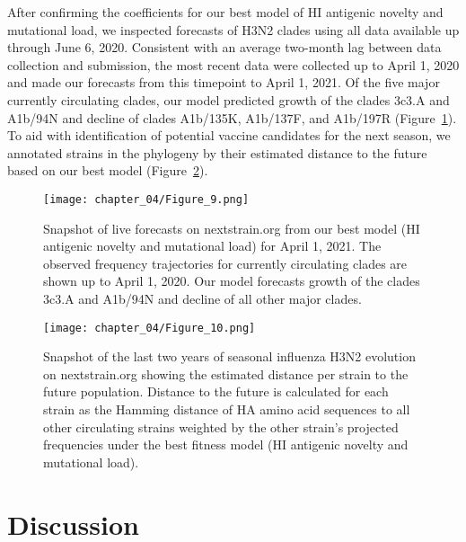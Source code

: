 After confirming the coefficients for our best model of HI antigenic novelty and mutational load, we inspected forecasts of H3N2 clades using all data available up through June 6, 2020.
Consistent with an average two-month lag between data collection and submission, the most recent data were collected up to April 1, 2020 and made our forecasts from this timepoint to April 1, 2021.
Of the five major currently circulating clades, our model predicted growth of the clades 3c3.A and A1b/94N and decline of clades A1b/135K, A1b/137F, and A1b/197R (Figure~\ref{fig:nextstrain_forecasts}).
To aid with identification of potential vaccine candidates for the next season, we annotated strains in the phylogeny by their estimated distance to the future based on our best model (Figure~\ref{fig:nextstrain_distance_to_future}).

\begin{figure}
  \begin{center}
  \texttt{[image: chapter\_04/Figure\_9.png]}
  \caption{
    Snapshot of live forecasts on nextstrain.org from our best model (HI antigenic novelty and mutational load) for April 1, 2021.
    The observed frequency trajectories for currently circulating clades are shown up to April 1, 2020.
    Our model forecasts growth of the clades 3c3.A and A1b/94N and decline of all other major clades.
  }
  \label{fig:nextstrain_forecasts}
  \end{center}
\end{figure}

\begin{figure}
  \begin{center}
  \texttt{[image: chapter\_04/Figure\_10.png]}
  \caption{
    Snapshot of the last two years of seasonal influenza H3N2 evolution on nextstrain.org showing the estimated distance per strain to the future population.
    Distance to the future is calculated for each strain as the Hamming distance of HA amino acid sequences to all other circulating strains weighted by the other strain's projected frequencies under the best fitness model (HI antigenic novelty and mutational load).
  }
  \label{fig:nextstrain_distance_to_future}
  \end{center}
\end{figure}

\section*{Discussion}

